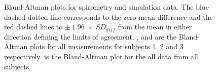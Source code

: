 \begin{figure}
\centering
{}

\caption[Bland-Altman plots for spirometry and simulation data]{\label{fig:ba_plots}Bland-Altman plots for spirometry and simulation data.
The blue dashed-dotted line corresponds to the zero mean difference and the red dashed lines to $\pm~1.96~\times~SD_{diff}$ from the mean in either direction defining the limits of agreement.
,  and  are the Bland-Altman plots for all measurements for subjects 1, 2 and 3 respectively.
 is the Bland-Altman plot for the all data from all subjects.
}
\end{figure}

